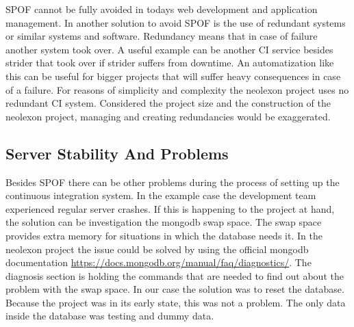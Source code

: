 SPOF cannot be fully avoided in todays web development and application management. In \cite{ulbrich2012eliminating} another solution to avoid SPOF is
the use of redundant systems or similar systems and software. Redundancy means that in case of failure another system took over. A useful example
can be another CI service besides strider that took over if strider suffers from downtime. An automatization like this can be useful for bigger
projects that will suffer heavy consequences in case of a failure. For reasons of simplicity and complexity the neolexon project uses no redundant
CI system. Considered the project size and the construction of the neolexon project, managing and creating redundancies would be exaggerated.
\cite{ulbrich2012eliminating}

\subsection{Server Stability And Problems}
\label{section:Server Stability And Problems}
Besides SPOF there can be other problems during the process of setting up the continuous integration system. In the example case the development team
experienced regular server crashes. If this is happening to the project at hand, the solution can be investigation the mongodb swap space.
The swap space provides extra memory for situations in which the database needs it. In the neolexon project the issue could be solved by using the official
mongodb documentation \url{https://docs.mongodb.org/manual/faq/diagnostics/}. The diagnosis section is holding the commands that are needed to find out about the problem with the swap space. In our case
the solution was to reset the database. Because the project was in its early state, this was not a problem. The only data inside the database was testing and
dummy data.

\newpage
